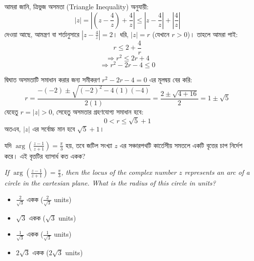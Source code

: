 \documentclass[12pt, a4paper]{article}
\begin{document}
\begin{tcolorbox}[solutionbox={সমাধান (Solution)}]
    \noindent
    আমরা জানি, ত্রিভুজ অসমতা (Triangle Inequality) অনুযায়ী:
    \[ |z| = \left|\left(z - \frac{4}{z}\right) + \frac{4}{z}\right| \leq \left|z - \frac{4}{z}\right| + \left|\frac{4}{z}\right| \]
    দেওয়া আছে, আমন্ত্রণ বা শর্তানুসারে $\left|z - \frac{4}{z}\right| = 2$। ধরি, $|z| = r$ (যেখানে $r > 0$)। তাহলে আমরা পাই:
    \[ r \leq 2 + \frac{4}{r} \]
    \[ \Rightarrow r^2 \leq 2r + 4 \]
    \[ \Rightarrow r^2 - 2r - 4 \leq 0 \]
    
    \vspace{0.5em}
    দ্বিঘাত অসমতাটি সমাধান করার জন্য সমীকরণ $r^2 - 2r - 4 = 0$ এর মূলদ্বয় বের করি:
    \[ r = \frac{-(-2) \pm \sqrt{(-2)^2 - 4(1)(-4)}}{2(1)} = \frac{2 \pm \sqrt{4 + 16}}{2} = 1 \pm \sqrt{5} \]
    যেহেতু $r = |z| > 0$, সেহেতু অসমতার গ্রহণযোগ্য সমাধান হবে:
    \[ 0 < r \leq \sqrt{5} + 1 \]
    অতএব, $|z|$ এর সর্বোচ্চ মান হবে $\sqrt{5} + 1$।
\end{tcolorbox}
\vspace{1em}

\begin{tcolorbox}[questionbox={প্রশ্ন (Question) 14}]
    \noindent
    যদি $\arg\left(\frac{z-1}{z+1}\right) = \frac{\pi}{3}$ হয়, তবে জটিল সংখ্যা $z$ এর সঞ্চারপথটি কার্তেসীয় সমতলে একটি বৃত্তের চাপ নির্দেশ করে। এই বৃত্তটির ব্যাসার্ধ কত একক?
    
    \vspace{0.8em}
    \begin{english}
    \noindent\textit{\color{darkgray}
    If $\arg\left(\frac{z-1}{z+1}\right) = \frac{\pi}{3}$, then the locus of the complex number $z$ represents an arc of a circle in the cartesian plane. What is the radius of this circle in units?
    }
    \end{english}
\end{tcolorbox}

\begin{itemize}[label={}, leftmargin=1cm, itemsep=0.5em]
    \item[\textbf{A)}] $\frac{2}{\sqrt{3}}$ একক ($\frac{2}{\sqrt{3}}$ units)
    \item[\textbf{B)}] $\sqrt{3}$ একক ($\sqrt{3}$ units)
    \item[\textbf{C)}] $\frac{1}{\sqrt{3}}$ একক ($\frac{1}{\sqrt{3}}$ units)
    \item[\textbf{D)}] $2\sqrt{3}$ একক ($2\sqrt{3}$ units)
\end{itemize}
\end{document}
